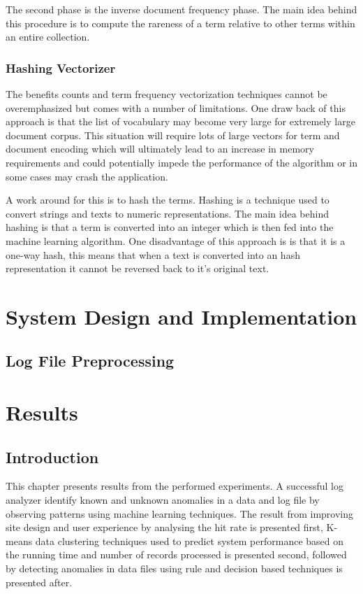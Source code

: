 \documentclass[12pt, letterpaper, titlepage]{report}
\begin{document}
The second phase is the inverse document frequency phase. The main idea behind this procedure is to compute the rareness of a term relative to other terms within an entire collection.


\subsection{Hashing Vectorizer}

The benefits counts and term frequency vectorization techniques cannot be overemphasized but comes with a number of limitations. One draw back of this approach is that the list of vocabulary may become very large for extremely large document corpus. This situation will require lots of large vectors for term and document encoding which will ultimately lead to an increase in memory requirements and could potentially impede the performance of the algorithm or in some cases may crash the application.

A work around for this is to hash the terms. Hashing is a technique used to convert strings and texts to numeric representations. The main idea behind hashing is that a term is converted into an integer  which is then fed into the machine learning algorithm. One disadvantage of this approach is is that it is a one-way hash, this means that when a text is converted into an hash representation it cannot be reversed back to it’s original text.


\chapter{\textbf{System Design and Implementation}}

\section{Log File Preprocessing}


\chapter{\textbf{Results}}

\section{Introduction}
This chapter presents results from the performed experiments. A successful log analyzer identify known and unknown anomalies in a data and log file by observing patterns using machine learning techniques.  The result from improving site design and user experience by analysing the hit rate is presented first, K-means data clustering techniques used to predict system performance based on the running time and number of records processed is presented second, followed by detecting anomalies in data files using rule and decision based techniques is presented after.
\end{document}
